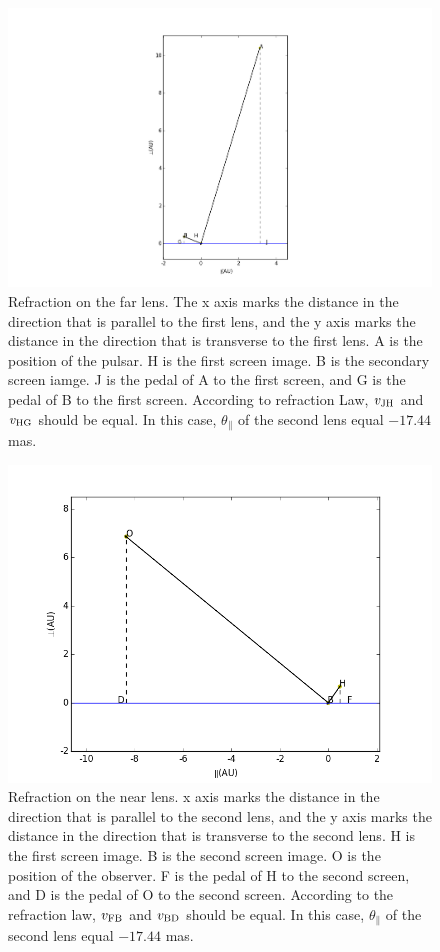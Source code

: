 \documentclass[useAMS,usenatbib]{mn2e}
\begin{document}
\begin{figure}
\centering
\includegraphics[width=1.0\linewidth,scale=1.0]{First_reflection.png}
\caption{Refraction on the far lens. The x axis marks the distance in the direction that is parallel to the first lens, and the y axis marks the distance in the direction that is transverse to the first lens. A is the position of the pulsar. H is the first screen image. B is the secondary screen iamge. J is the pedal of A to the first screen, and G is the pedal of B to the first screen. According to refraction Law, $v_{\rm JH}$ and $v_{\rm HG}$ should be equal. In this case, $\theta_{\parallel}$ of the second lens equal $-17.44$ mas.}
\label{first_reflect}
\end{figure}

\begin{figure}
\centering
\includegraphics[width=1.0\linewidth]{Second_reflection.png}
\caption{Refraction on the near lens. x axis marks the distance in the direction that is parallel to the second lens, and the y axis marks the distance in the direction that is transverse to the second lens. H is the first screen image. B is the second screen image. O is the position of the observer. F is the pedal of H to the second screen, and D is the pedal of O to the second screen. According to the refraction law, $v_{\rm FB}$ and $v_{\rm BD}$ should be equal. In this case, $\theta_{\parallel}$ of the second lens equal $-17.44$ mas. }
\label{second_reflect}
\end{figure}
\end{document}
